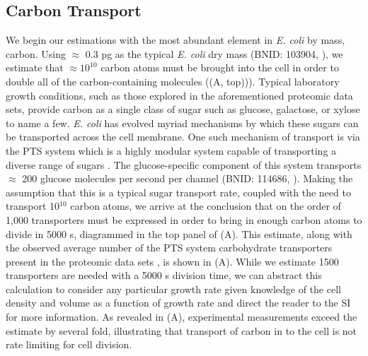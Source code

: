 \subsection{Carbon Transport}
We begin our estimations with the most abundant element in \textit{E. coli}
by mass, carbon. Using $\approx$ 0.3 pg as the typical \textit{E. coli} dry
mass (BNID: 103904, \cite{milo2010}), we estimate that $\approx 10^{10}$
carbon atoms must be brought into the cell in order to double all of the
carbon-containing molecules ((A, top))). Typical laboratory
growth conditions, such as those explored in the aforementioned proteomic
data sets, provide carbon as a single class of sugar such as glucose,
galactose, or xylose to name a few. \textit{E. coli} has evolved myriad
mechanisms by which these sugars can be transported across the cell membrane.
One such mechanism of transport is via the PTS system which is a highly
modular system capable of transporting a diverse range of sugars
\citep{escalante2012}. The glucose-specific component of this system
transports $\approx$ 200 glucose molecules per second per channel (BNID:
114686, \cite{milo2010}). Making the assumption that this is a typical sugar
transport rate, coupled with the need to transport 10$^{10}$ carbon atoms, we
arrive at the conclusion that on the order of 1,000 transporters must be
expressed in order to bring in enough carbon atoms to divide in 5000 s,
diagrammed in the top panel of (A). This estimate, along
with the observed average number of the PTS system carbohydrate transporters present in the
proteomic data sets \citep{schmidt2016, peebo2015,valgepea2013,li2014}, is
shown in (A). While we estimate 1500 transporters are
needed with a 5000 s division time, we can abstract this calculation to consider
any particular growth rate given knowledge of the cell density and volume as a
function of growth rate and direct the reader to the SI for more information. As
revealed in (A), experimental measurements exceed the estimate
by several fold, illustrating that transport of carbon in to the cell is not
rate limiting for cell division.
